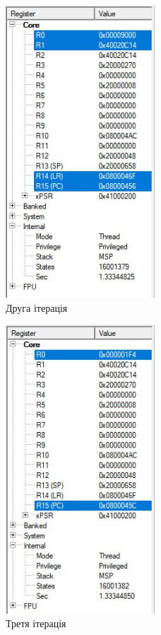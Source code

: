 \documentclass[12pt]{extarticle}
\begin{document}
\begin{figure}[H]
    \centering
    \includegraphics[width=0.50\textwidth]{reg2.jpg}
    \caption{Друга ітерація}
\end{figure}

\begin{figure}[H]
    \centering
    \includegraphics[width=0.50\textwidth]{reg3.jpg}
    \caption{Третя ітерація}
\end{figure}
\end{document}
